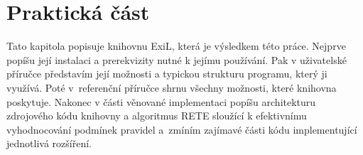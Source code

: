 \section{Praktická část}

Tato kapitola popisuje knihovnu ExiL, která je výsledkem této práce.
Nejprve popíšu její instalaci a prerekvizity nutné k jejímu používání. Pak v
uživatelské příručce představím její možnosti a typickou strukturu programu,
který ji využívá. Poté v~referenční příručce shrnu všechny možnosti, které
knihovna poskytuje. Nakonec v části věnované implementaci popíšu architekturu
zdrojového kódu knihovny a algoritmus RETE sloužící k efektivnímu vyhodnocování
podmínek pravidel a~zmíním zajímavé části kódu implementující jednotlivá
rozšíření.


\clearpage

\clearpage

% 
\clearpage

\clearpage

